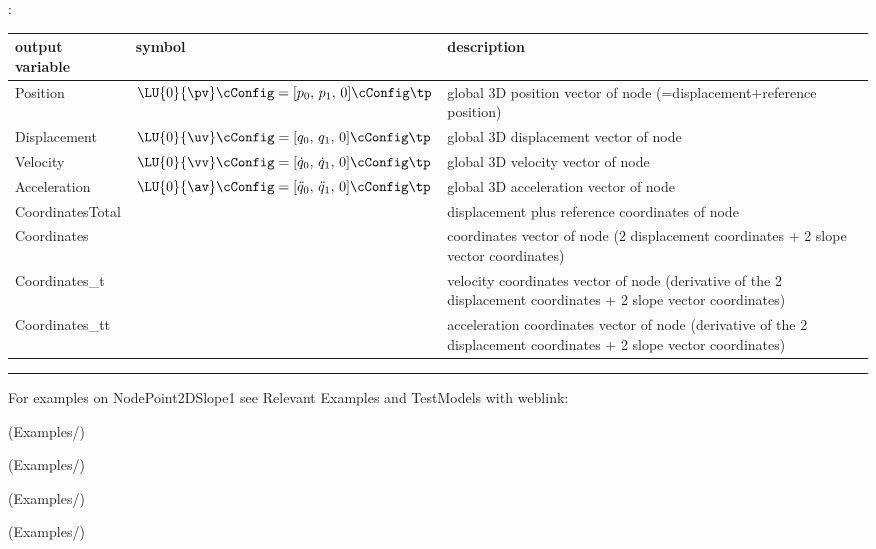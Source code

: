 :
\begin{center}
\footnotesize
\begin{longtable}{| p{5cm} | p{5cm} | p{6cm} |} 
\hline
\bf output variable & \bf symbol & \bf description \\ \hline
Position & $\LU{0}{\pv}\cConfig = [p_0,\, p_1,\,0]\cConfig\tp$ & global 3D position vector of node (=displacement+reference position)\\ \hline
Displacement & $\LU{0}{\uv}\cConfig = [q_0,\, q_1,\,0]\cConfig\tp$ & global 3D displacement vector of node\\ \hline
Velocity & $\LU{0}{\vv}\cConfig = [\dot q_0,\,\dot q_1,\,0]\cConfig\tp$ & global 3D velocity vector of node\\ \hline
Acceleration & $\LU{0}{\av}\cConfig = [\ddot q_0,\,\ddot q_1,\,0]\cConfig\tp$ & global 3D acceleration vector of node\\ \hline
CoordinatesTotal &  & displacement plus reference coordinates of node\\ \hline
Coordinates &  & coordinates vector of node (2 displacement coordinates + 2 slope vector coordinates)\\ \hline
Coordinates\_t &  & velocity coordinates vector of node (derivative of the 2 displacement coordinates + 2 slope vector coordinates)\\ \hline
Coordinates\_tt &  & acceleration coordinates vector of node (derivative of the 2 displacement coordinates + 2 slope vector coordinates)\\ \hline
\end{longtable}
\end{center}
\vspace{6pt}\par\noindent\rule{\textwidth}{0.4pt}
%
\noindent For examples on NodePoint2DSlope1 see Relevant Examples and TestModels with weblink:
\bi
\item {} (Examples/)
\item {} (Examples/)
\item {} (Examples/)
\item {} (Examples/)
